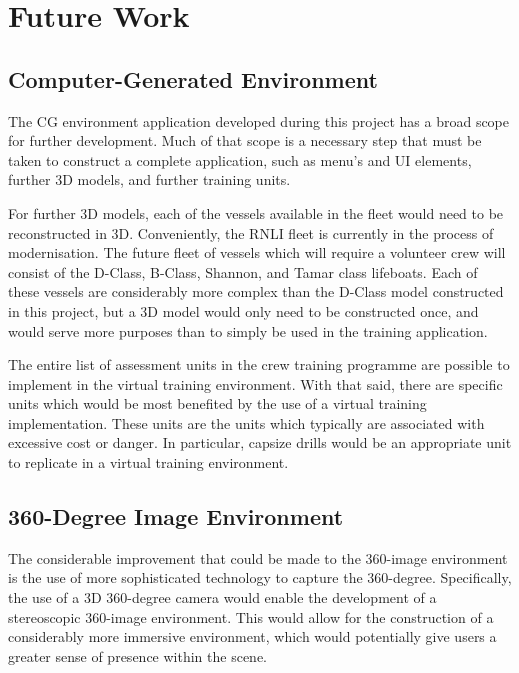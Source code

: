 \documentclass[ %
                    author={Elis Jones},
                supervisor={Dr. Kirsten Cater},
                    degree={BSc},
                     title={The Effect of Presentation Medium on Spatial Cognition},
                  subtitle={in the Virtual Environment},
                      year={2018} ]{dissertation}
\begin{document}
\section{Future Work}\label{further}
\subsection{Computer-Generated Environment}
The CG environment application developed during this project has a broad scope for further development. Much of that scope is a necessary step that must be taken to construct a complete application, such as menu's and UI elements, further 3D models, and further training units. 

For further 3D models, each of the vessels available in the fleet would need to be reconstructed in 3D. Conveniently, the RNLI fleet is currently in the process of modernisation. The future fleet of vessels which will require a volunteer crew will consist of the D-Class, B-Class, Shannon, and Tamar class lifeboats. Each of these vessels are considerably more complex than the D-Class model constructed in this project, but a 3D model would only need to be constructed once, and would serve more purposes than to simply be used in the training application. 

The entire list of assessment units in the crew training programme are possible to implement in the virtual training environment. With that said, there are specific units which would be most benefited by the use of a virtual training implementation. These units are the units which typically are associated with excessive cost or danger. In particular, capsize drills would be an appropriate unit to replicate in a virtual training environment. 

\subsection{360-Degree Image Environment}
The considerable improvement that could be made to the 360-image environment is the use of more sophisticated technology to capture the 360-degree. Specifically, the use of a 3D 360-degree camera would enable the development of a stereoscopic 360-image environment. This would allow for the construction of a considerably more immersive environment, which would potentially give users a greater sense of presence within the scene. 
\end{document}
